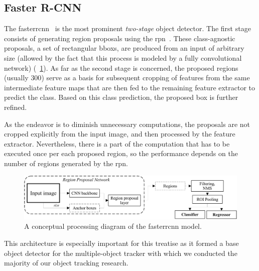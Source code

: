 \subsection{Faster R-CNN}
\label{ssec:FasterRCNN}

The \gls{fasterrcnn}~\cite{ren2017fasterrcnn} is the most prominent \emph{two-stage} object detector. The first stage consists of generating region proposals using the \gls{rpn}~\cite{huang2017speedacctradeoff}. These class-agnostic proposals, a set of rectangular \glspl{bbox}, are produced from an input of arbitrary size (allowed by the fact that this process is modeled by a fully convolutional network) (\figtext{}~\ref{fig:FasterRCNNPipeline}). As far as the second stage is concerned, the proposed regions (usually $300$) serve as a basis for subsequent cropping of features from the same intermediate feature maps that are then fed to the remaining feature extractor to predict the class. Based on this class prediction, the proposed box is further refined.

As the endeavor is to diminish unnecessary computations, the proposals are not cropped explicitly from the input image, and then processed by the feature extractor. Nevertheless, there is a part of the computation that has to be executed once per each proposed region, so the performance depends on the number of regions generated by the \gls{rpn}.

\begin{figure}[t]
    \centerline{\includegraphics[width=\linewidth]{figures/theoretical_foundations/fastercnn_diagram.pdf}}
    \caption[\gls{fasterrcnn} processing diagram]{A conceptual processing diagram of the \gls{fasterrcnn} model.}
    \label{fig:FasterRCNNPipeline}
\end{figure}

This architecture is especially important for this treatise as it formed a base object detector for the multiple-object tracker with which we conducted the majority of our object tracking research.
